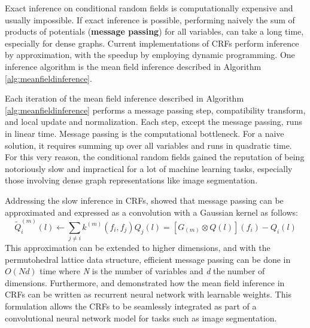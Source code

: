 \documentclass[10pt, journal, compsoc]{IEEEtran}
\begin{document}
Exact inference on conditional random fields is computationally expensive and usually impossible. If exact inference is possible, performing naively the sum of products of potentials (\textbf{message passing}) for all variables, can take a long time, especially for dense graphs. Current implementations of CRFs perform inference by approximation, with the speedup by employing dynamic programming. One inference algorithm is the mean field inference described in Algorithm \ref{alg:meanfieldinference}.

Each iteration of the mean field inference described in Algorithm \ref{alg:meanfieldinference} performs a message passing step, compatibility transform, and local update and normalization. Each step, except the message passing, runs in linear time. Message passing is the computational bottleneck. For a naive solution, it requires summing up over all variables and runs in quadratic time. For this very reason, the conditional random fields gained the reputation of being notoriously slow and impractical for a lot of machine learning tasks, especially those involving dense graph representations like image segmentation.

Addressing the slow inference in CRFs, \cite{NIPS2011_4296} showed that message passing can be approximated and expressed as a convolution with a Gaussian kernel as follows:
\begin{equation}
\widetilde{Q}_i^{(m)}(l)\gets \sum_{j\neq i}k^{(m)}(f_i,f_j)Q_j(l) = [G_(m) \otimes Q(l)](f_i) - Q_i(l)
\end{equation}
This approximation can be extended to higher dimensions, and with the permutohedral lattice data structure, efficient message passing can be done in $O(Nd)$ time where \textit{N} is the number of variables and \textit{d} the number of dimensions. 
Furthermore, \cite{crfasrnn_ICCV2015} and \cite{higherordercrf_ECCV2016} demonstrated how the mean field inference in CRFs can be written as recurrent neural network with learnable weights. This formulation allows the CRFs to be seamlessly integrated as part of a convolutional neural network model for tasks such as image segmentation.
\end{document}
